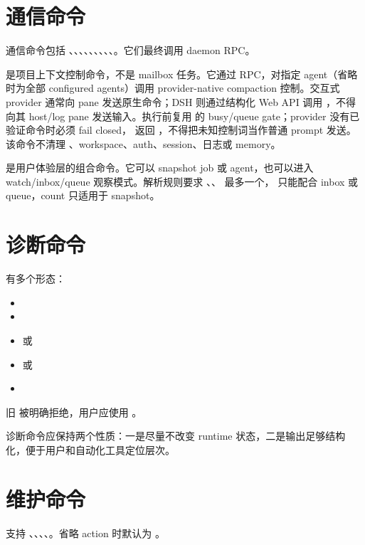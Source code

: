 \section{通信命令}

通信命令包括 、、、、、、、、、。它们最终调用 daemon RPC。

 是项目上下文控制命令，不是 mailbox 任务。它通过
 RPC，对指定 agent（省略时为全部 configured
agents）调用 provider-native compaction 控制。交互式 provider 通常向 pane
发送原生命令；DSH 则通过结构化 Web API 调用 ，不得向其
host/log pane 发送输入。执行前复用
 的 busy/queue gate；provider 没有已验证命令时必须 fail closed，
返回 ，不得把未知控制词当作普通 prompt 发送。该命令不清理
、workspace、auth、session、日志或 memory。

 是用户体验层的组合命令。它可以 snapshot job 或 agent，也可以进入 watch/inbox/queue 观察模式。解析规则要求 、、 最多一个， 只能配合 inbox 或 queue，count 只适用于 snapshot。

\section{诊断命令}

 有多个形态：

\begin{itemize}
  \item {}
  \item {}
  \item {} 或 
  \item {} 或 
  \item {}
\end{itemize}

旧  被明确拒绝，用户应使用 。

诊断命令应保持两个性质：一是尽量不改变 runtime 状态，二是输出足够结构化，便于用户和自动化工具定位层次。

\section{维护命令}

 支持 、、、、。省略 action 时默认为 。

